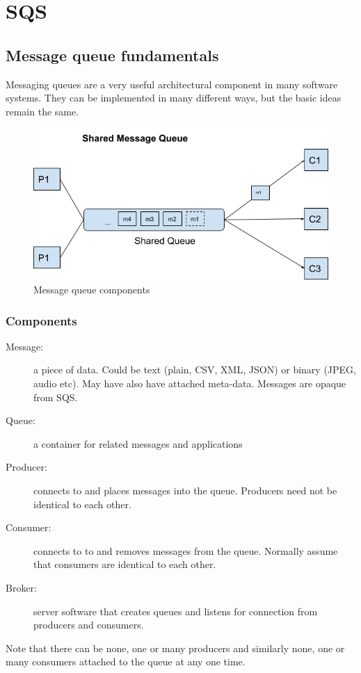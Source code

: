 \chapter{SQS}
\label{ch:sqs}

\section{Message queue fundamentals}\label{message-queue-fundamentals}

Messaging queues are a very useful architectural component in many
software systems. They can be implemented in many different ways, but
the basic ideas remain the same.

\begin{figure}
\centering
\includegraphics[width=0.6\linewidth]{shared_message_queue}
\caption{Message queue components}
\end{figure}

\subsection{Components}\label{components}

\begin{description}
\item[Message:]
a piece of data. Could be text (plain, CSV, XML, JSON) or binary (JPEG,
audio etc). May have also have attached meta-data. Messages are opaque
from SQS.
\item[Queue:]
a container for related messages and applications
\item[Producer:]
connects to and places messages into the queue. Producers need not be
identical to each other.
\item[Consumer:]
connects to to and removes messages from the queue. Normally assume that
consumers are identical to each other.
\item[Broker:]
server software that creates queues and listens for connection from
producers and consumers.
\end{description}

Note that there can be none, one or many producers and similarly none,
one or many consumers attached to the queue at any one time.

